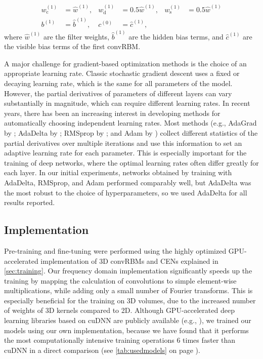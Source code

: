 \begin{align}
w_{\text{c}}^{(1)} &= \hat{w}^{(1)}, &
w_{\text{d}}^{(1)} &= 0.5\hat{w}^{(1)}, &
w_{\text{s}}^{(1)} &= 0.5\hat{w}^{(1)} \\
b^{(1)} &= \hat{b}^{(1)}, &
c^{(0)} &= \hat{c}^{(1)},
\end{align}
where $\hat{w}^{(1)}$ are the filter weights, $\hat{b}^{(1)}$ are the hidden
bias terms, and $\hat{c}^{(1)}$ are the visible bias terms of the first convRBM.

A major challenge for gradient-based optimization methods is the choice of an
appropriate learning rate. Classic stochastic gradient descent \citep{lecun1998}
uses a fixed or decaying learning rate, which is the same for all parameters of
the model. However, the partial derivatives of parameters of different layers
can vary substantially in magnitude, which can require different learning rates.
In recent years, there has been an increasing interest in developing methods for
automatically choosing independent learning rates. Most methods (e.g., AdaGrad
by \citealp{duchi2011adaptive}; AdaDelta by \citealp{zeiler2012adadelta};
RMSprop by \citealp{dauphin2015rmsprop}; and Adam by \citealp{kingma2014adam})
collect different statistics of the partial derivatives over multiple iterations
and use this information to set an adaptive learning rate for each parameter.
This is especially important for the training of deep networks, where the
optimal learning rates often differ greatly for each layer. In our initial
experiments, networks obtained by training with AdaDelta, RMSprop, and Adam
performed comparably well, but AdaDelta was the most robust to the choice of
hyperparameters, so we used AdaDelta for all results reported.

\subsection{Implementation}


Pre-training and fine-tuning were performed using the highly optimized
GPU-accelerated implementation of 3D convRBMs and CENs explained in
\ref{sec:training}. Our frequency domain
implementation significantly speeds up the training by mapping the calculation
of convolutions to simple element-wise multiplications, while adding only a
small number of Fourier transforms. This is especially beneficial for the
training on 3D volumes, due to the increased number of weights of 3D kernels
compared to 2D. Although GPU-accelerated deep learning libraries based on cuDNN
\citep{chetlur2014} are publicly available (e.g.,
\citealp{jia2014,bastien2012,collobert2011torch7}), we trained our models using
our own implementation, because we have found that it performs the most
computationally intensive training operations 6 times faster than cuDNN in a
direct comparison (see \ref{tab:usedmodels} on page \pageref{tab:usedmodels}).
 

